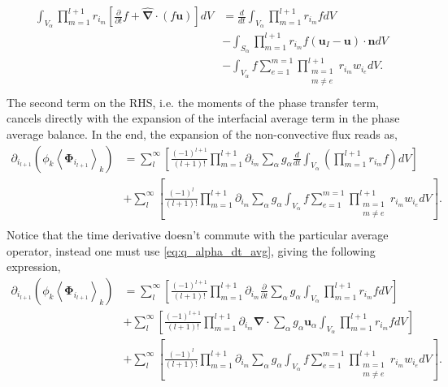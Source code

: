 \documentclass[twocolumn]{My_article}
\newcommand{\kavg}[1]{\left<#1\right>_k}
\newcommand{\pri}[2]{ \prod_{m=#1}^{#2} r_{i_m}}
\newcommand{\nablab}{\bm{\nabla}}
\newcommand{\nablabh}{\hat{\bm{\nabla}}}
\newcommand{\ddt}{\frac{d}{d t}}
\newcommand{\pddt}{\frac{\partial}{\partial t}}
\begin{document}
\begin{align*}
    \int_{V_\alpha}\pri{1}{l+1}\left[
        \pddt f
        +
        \nablabh \cdot (f \textbf{u})
    \right]dV
    &= \ddt \int_{V_\alpha}
    \pri{1}{l+1}  f dV   \\
    &- \int_{S_\alpha}
    \pri{1}{l+1}  f (\textbf{u}_I - \textbf{u})\cdot \textbf{n} dV \\
    &- \int_{V_\alpha}f \sum_{e=1}^{m=1}
    \prod^{l+1}_{\substack{m=1\\ m\neq e}}
    r_{i_m}
    w_{i_e}
    dV.\\
\end{align*}
The second term on the RHS, i.e. the moments of the phase transfer term, cancels directly with the expansion of the interfacial average term in the phase average balance.
In the end, the expansion of the non-convective flux reads as,
\begin{align*}
    \partial_{i_{l+1}}
    (\phi_k \kavg{\bm{\Phi}_{i_{l+1}}})
    & =\sum_l^\infty
    \left[
        \frac{(-1)^{l+1}}{(l+1)!}
        \prod^{l+1}_{m=1}
        \partial_{i_m}
        \sum_{\alpha}
        g_{\alpha}\ddt \int_{V_\alpha}
        \left(\pri{1}{l+1}  f \right)dV
    \right]\\
    &+\sum_l^\infty
    \left[
        \frac{(-1)^{l}}{(l+1)!}
        \prod^{l+1}_{m=1}
        \partial_{i_m}
        \sum_{\alpha}
        g_{\alpha}\int_{V_\alpha}
        f\sum_{e=1}^{m=1}
        \prod^{l+1}_{\substack{m=1\\ m\neq e}}
        r_{i_m}
        w_{i_e}
         dV
    \right].\\
\end{align*}
Notice that the time derivative doesn't commute with the particular average operator, instead one must use \ref{eq:q_alpha_dt_avg}, giving the following expression,
\begin{align}
    \partial_{i_{l+1}}
    (\phi_k \kavg{\bm{\Phi}_{i_{l+1}}})
    & =\sum_l^\infty
    \left[
        \frac{(-1)^{l+1}}{(l+1)!}
        \prod^{l+1}_{m=1}
        \partial_{i_m}
        \pddt
        \sum_{\alpha}
        g_{\alpha} \int_{V_\alpha}
        \pri{1}{l+1}  f dV
    \right]
    \\
    & + \sum_l^\infty
    \left[
        \frac{(-1)^{l+1}}{(l+1)!}
        \prod^{l+1}_{m=1}
        \partial_{i_m}
        \nablab \cdot
        \sum_{\alpha}
        g_{\alpha} \textbf{u}_\alpha
        \int_{V_\alpha}
        \pri{1}{l+1}  f  dV
        \right]\\
        &+\sum_l^\infty
    \left[
        \frac{(-1)^{l}}{(l+1)!}
        \prod^{l+1}_{m=1}
        \partial_{i_m}
        \sum_{\alpha}
        g_{\alpha}\int_{V_\alpha}
        f\sum_{e=1}^{m=1}
        \prod^{l+1}_{\substack{m=1\\ m\neq e}}
        r_{i_m}
        w_{i_e}
        dV
    \right].
    \label{ap:eq:partial_Phi}
\end{align}
\end{document}
